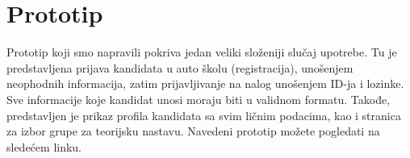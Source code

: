 \section{Prototip}
\label{sec:prototip}
Prototip koji smo napravili pokriva jedan veliki složeniji slučaj upotrebe.
Tu je predstavljena prijava kandidata u auto školu (registracija), unošenjem neophodnih informacija, zatim prijavljivanje na nalog
unošenjem ID-ja i lozinke. Sve informacije koje kandidat unosi moraju biti u validnom formatu. Takođe, predstavljen je prikaz profila kandidata sa svim ličnim podacima, kao i stranica za izbor grupe za teorijsku nastavu.  
Navedeni prototip možete pogledati na sledećem linku.


